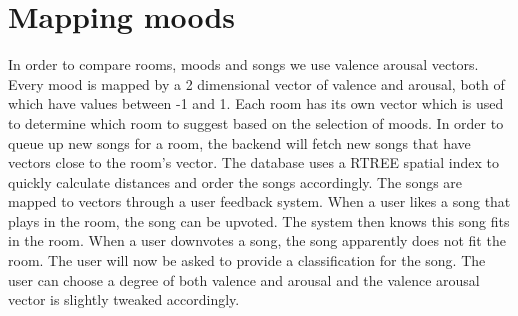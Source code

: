 \section{Mapping moods}
In order to compare rooms, moods and songs we use valence arousal vectors.
Every mood is mapped by a 2 dimensional vector of valence and arousal, both of which have values between -1 and 1.
Each room has its own vector which is used to determine which room to suggest based on the selection of moods.
In order to queue up new songs for a room, the backend will fetch new songs that have vectors close to the room's vector.
The database uses a RTREE spatial index to quickly calculate distances and order the songs accordingly.
The songs are mapped to vectors through a user feedback system.
When a user likes a song that plays in the room, the song can be upvoted.
The system then knows this song fits in the room.
When a user downvotes a song, the song apparently does not fit the room.
The user will now be asked to provide a classification for the song.
The user can choose a degree of both valence and arousal and the valence arousal vector is slightly tweaked accordingly.
